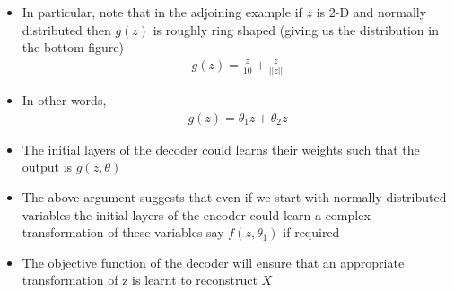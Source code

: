 \documentclass[serif,aspectratio=169,dvipsnames]{beamer}
\begin{document}
\begin{frame}
\begin{columns}
		\begin{overlayarea}{\textwidth}{\textheight}
			\footnotesize{\begin{itemize}\justifying
				\item<1-> In particular, note that in the adjoining example if $z$ is 2-D and normally distributed then $g(z)$ is roughly ring shaped (giving us the distribution in the bottom figure)
				\vspace{-4mm}
				\begin{align*}
				g(z) = \frac{z}{10} + \frac{z}{||z||}
				\end{align*}
				\vspace{-6mm}
				\item<2-> In other words, 
				\vspace{-4mm}
				\begin{align*}
				g(z) = \theta_1 z + \theta_2 z
				\end{align*}
				\vspace{-8mm}
				\item<3-> The initial layers of the decoder could learns their weights such that the output is $g(z, \theta)$
				\item<4-> The above argument suggests that even if we start with normally distributed variables the initial layers of the encoder could learn a complex transformation of these variables say $f(z, \theta_1)$ if required
				\item<5-> The objective function of the decoder will ensure that an appropriate transformation of z is learnt to reconstruct $X$
			\end{itemize}}
		\end{overlayarea}
	\end{columns}
\end{frame}
\end{document}
